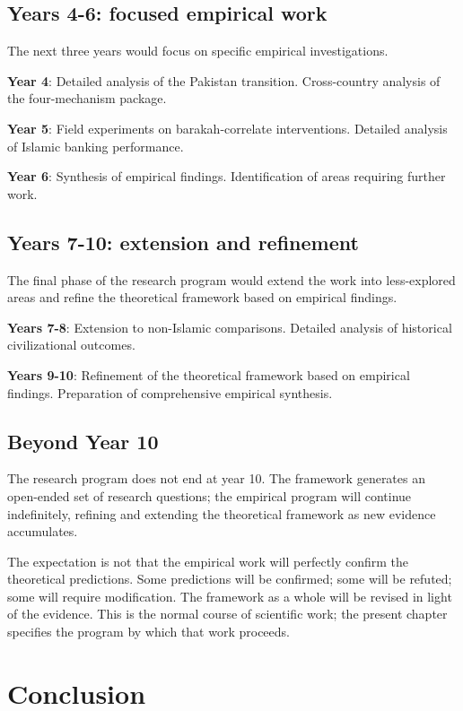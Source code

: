 \subsection{Years 4-6: focused empirical work}

The next three years would focus on specific empirical
investigations.

\textbf{Year 4}: Detailed analysis of the Pakistan transition.
Cross-country analysis of the four-mechanism package.

\textbf{Year 5}: Field experiments on barakah-correlate
interventions. Detailed analysis of Islamic banking performance.

\textbf{Year 6}: Synthesis of empirical findings. Identification
of areas requiring further work.

\subsection{Years 7-10: extension and refinement}

The final phase of the research program would extend the work
into less-explored areas and refine the theoretical framework
based on empirical findings.

\textbf{Years 7-8}: Extension to non-Islamic comparisons.
Detailed analysis of historical civilizational outcomes.

\textbf{Years 9-10}: Refinement of the theoretical framework
based on empirical findings. Preparation of comprehensive
empirical synthesis.

\subsection{Beyond Year 10}

The research program does not end at year 10. The framework
generates an open-ended set of research questions; the empirical
program will continue indefinitely, refining and extending the
theoretical framework as new evidence accumulates.

The expectation is not that the empirical work will perfectly
confirm the theoretical predictions. Some predictions will be
confirmed; some will be refuted; some will require modification.
The framework as a whole will be revised in light of the
evidence. This is the normal course of scientific work; the
present chapter specifies the program by which that work proceeds.

\section{Conclusion}

